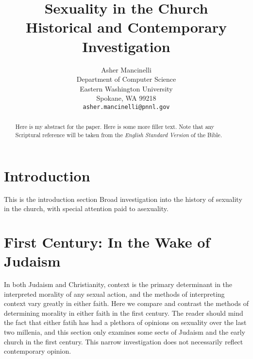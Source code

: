 \documentclass{article}
\title{
    Sexuality in the Church \\ 
    \large Historical and Contemporary Investigation}
\author{
  Asher Mancinelli \\
  Department of Computer Science\\
  Eastern Washington University\\
  Spokane, WA 99218 \\
  \texttt{asher.mancinelli@pnnl.gov} \\ }
\begin{document}
\maketitle

\begin{abstract}
    Here is my abstract for the paper. Here is some more filler text. Note
    that any Scriptural reference will be taken from the \textit{English
    Standard Version} of the Bible.
\end{abstract}


\linespread{2}

\section{Introduction}
    This is the introduction section
    Broad investigation into the history of sexuality in the church, with
    special attention paid to asexuality.

\section{First Century: In the Wake of Judaism}

In both Judaism and Christianity, context is the primary determinant in 
the interpreted morality of any sexual action, and the methods of interpreting
context vary greatly in either faith. Here we compare and contrast the 
methods of determining morality in either faith in the first century. The
reader should mind the fact that either fatih has had a plethora of opinions on
sexuality over the last two millenia, and this section only examines some sects
of Judaism and the early church in the first century. This narrow investigation
does not necessarily reflect contemporary opinion.
\end{document}
